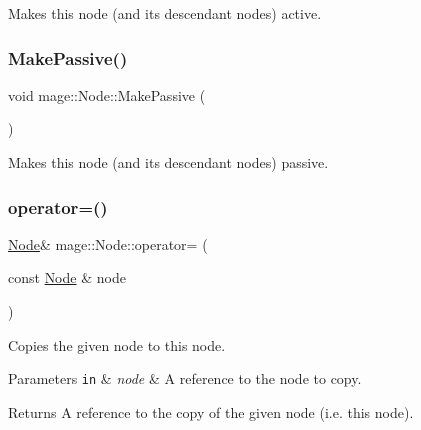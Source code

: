 Makes this node (and its descendant nodes) active. \hypertarget{classmage_1_1_node_aee4af2ccc576c422643d478ffafce5c4}{}\label{classmage_1_1_node_aee4af2ccc576c422643d478ffafce5c4} 
\subsubsection{\texorpdfstring{Make\+Passive()}{MakePassive()}}
{\footnotesize\ttfamily void mage\+::\+Node\+::\+Make\+Passive (\begin{DoxyParamCaption}{ }\end{DoxyParamCaption})\hspace{0.3cm}{\ttfamily [noexcept]}}

Makes this node (and its descendant nodes) passive. \hypertarget{classmage_1_1_node_ad10ea13608963acfa06d3c1577314da5}{}\label{classmage_1_1_node_ad10ea13608963acfa06d3c1577314da5} 
\subsubsection{\texorpdfstring{operator=()}{operator=()}\hspace{0.1cm}{\footnotesize\ttfamily [1/2]}}
{\footnotesize\ttfamily \hyperlink{classmage_1_1_node}{Node}\& mage\+::\+Node\+::operator= (\begin{DoxyParamCaption}\item[{const \hyperlink{classmage_1_1_node}{Node} \&}]{node }\end{DoxyParamCaption})\hspace{0.3cm}{\ttfamily [delete]}}

Copies the given node to this node.


\begin{DoxyParams}[1]{Parameters}
\mbox{\tt in}  & {\em node} & A reference to the node to copy. \\
\hline
\end{DoxyParams}
\begin{DoxyReturn}{Returns}
A reference to the copy of the given node (i.\+e. this node). 
\end{DoxyReturn}
\hypertarget{classmage_1_1_node_a007043de35c65edb9a0d790824186151}{}\label{classmage_1_1_node_a007043de35c65edb9a0d790824186151} 
